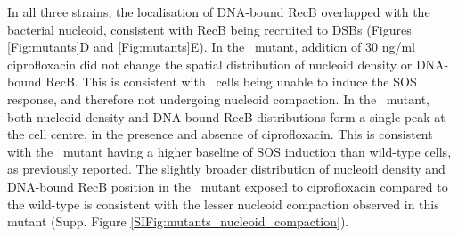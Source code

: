 In all three strains, the localisation of DNA-bound RecB overlapped with the bacterial nucleoid, consistent with RecB being recruited to DSBs (Figures \ref{Fig:mutants}D and \ref{Fig:mutants}E). In the \dreca\ mutant, addition of 30 ng/ml ciprofloxacin did not change the spatial distribution of nucleoid density or DNA-bound RecB. This is consistent with \dreca\ cells being unable to induce the SOS response, and therefore not undergoing nucleoid compaction. In the \teneighty\ mutant, both nucleoid density and DNA-bound RecB distributions form a single peak at the cell centre, in the presence and absence of ciprofloxacin. This is consistent with the \teneighty\ mutant having a higher baseline of SOS induction than wild-type cells, as previously reported\cite{Lepore2023}. The slightly broader distribution of nucleoid density and DNA-bound RecB position in the \teneighty\ mutant exposed to ciprofloxacin compared to the wild-type is consistent with the lesser nucleoid compaction observed in this mutant (Supp. Figure \ref{SIFig:mutants_nucleoid_compaction}).
